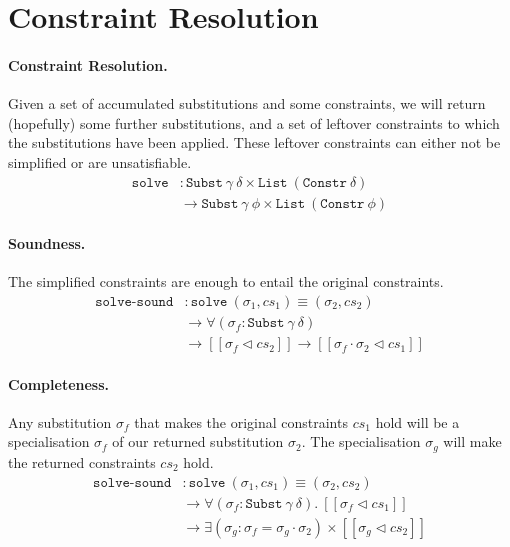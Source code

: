 \documentclass[sigplan,screen,review]{acmart}
\begin{document}
\hypertarget{constraint-resolution}{%
\section{Constraint Resolution}\label{constraint-resolution}}

\paragraph{Constraint Resolution.}

Given a set of accumulated substitutions and some constraints, we will
return (hopefully) some further substitutions, and a set of leftover
constraints to which the substitutions have been applied. These leftover
constraints can either not be simplified or are unsatisfiable. \[
\begin{aligned}
\texttt{solve} &: \texttt{Subst}~\gamma~\delta \times \texttt{List}~(\texttt{Constr}~\delta) \\
&\to \texttt{Subst}~\gamma~\phi \times \texttt{List}~(\texttt{Constr}~\phi)
\end{aligned}
\]

\paragraph{Soundness.}

The simplified constraints are enough to entail the original
constraints. \[
\begin{aligned}
\texttt{solve-sound}
&: \texttt{solve}~(\sigma_1, cs_1) \equiv (\sigma_2, cs_2) \\
&\to \forall (\sigma_f : \texttt{Subst}~\gamma~\delta) \\
& \to [\![ \sigma_f \triangleleft cs_2 ]\!] \to [\![ \sigma_f \cdot \sigma_2 \triangleleft cs_1 ]\!]
\end{aligned}
\]

\paragraph{Completeness.}

Any substitution \(\sigma_f\) that makes the original constraints
\(cs_1\) hold will be a specialisation \(\sigma_f\) of our returned
substitution \(\sigma_2\). The specialisation \(\sigma_g\) will make the
returned constraints \(cs_2\) hold. \[
\begin{aligned}
\texttt{solve-sound}
&: \texttt{solve}~(\sigma_1, cs_1) \equiv (\sigma_2, cs_2) \\
&\to \forall (\sigma_f : \texttt{Subst}~\gamma~\delta). ~ [\![ \sigma_f \triangleleft cs_1 ]\!] \\
&\to \exists (\sigma_g : \sigma_f = \sigma_g \cdot \sigma_2) \times [\![ \sigma_g \triangleleft cs_2 ]\!]
\end{aligned}
\]
\end{document}
